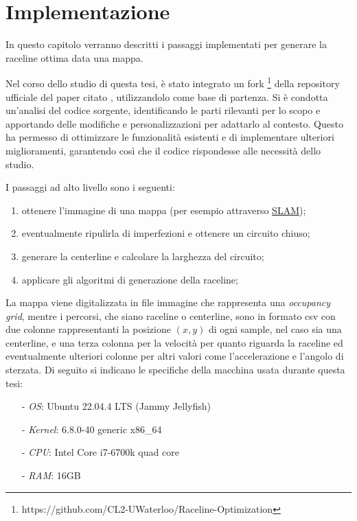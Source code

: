 
\chapter{Implementazione}
\label{chap:impl}
In questo capitolo verranno descritti i passaggi implementati per generare la raceline ottima data una
mappa.

Nel corso dello studio di questa tesi, è stato integrato un fork
\footnote{https://github.com/CL2-UWaterloo/Raceline-Optimization} della repository ufficiale del paper
citato \cite{christ2021time}, utilizzandolo come base di partenza. Si è condotta un'analisi del codice
sorgente, identificando le parti rilevanti per lo scopo e apportando delle modifiche e
personalizzazioni per adattarlo al contesto. Questo ha permesso di ottimizzare le funzionalità
esistenti e di implementare ulteriori miglioramenti, garantendo così che il codice rispondesse alle
necessità dello studio.

\bigskip
\noindent I passaggi ad alto livello sono i seguenti:
\begin{enumerate}
	\item ottenere l'immagine di una mappa (per esempio attraverso \hyperref[par:slam]{SLAM});
	\item eventualmente ripulirla di imperfezioni e ottenere un circuito chiuso; 
	\item generare la centerline e calcolare la larghezza del circuito;
	\item applicare gli algoritmi di generazione della raceline;
\end{enumerate}
La mappa viene digitalizzata in file immagine che rappresenta una \textit{occupancy grid}, mentre i
percorsi, che siano raceline o centerline, sono in formato csv con due colonne rappresentanti la
posizione $(x,y)$ di ogni sample, nel caso sia una centerline, e una terza colonna per la velocità per
quanto riguarda la raceline ed eventualmente ulteriori colonne per altri valori come l'accelerazione e
l'angolo di sterzata.
\newpage
Di seguito si indicano le specifiche della macchina usata durante questa tesi:
\begin{itemize}
	\item[-] \textit{OS}: Ubuntu 22.04.4 LTS (Jammy Jellyfish)
	\item[-] \textit{Kernel}: 6.8.0-40 generic x86\_64
	\item[-] \textit{CPU}: Intel Core i7-6700k quad core
	\item[-] \textit{RAM}: 16GB
\end{itemize}

